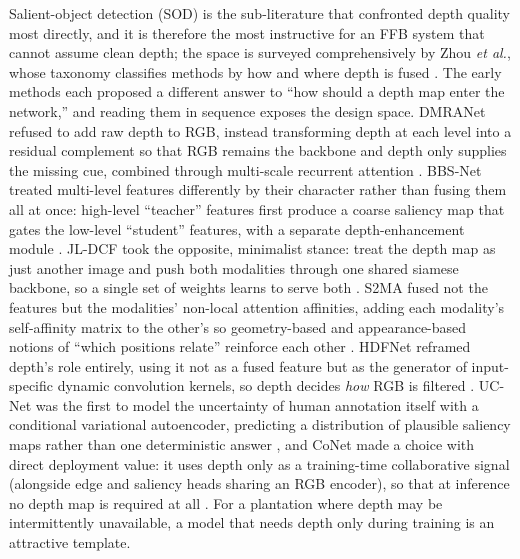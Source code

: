Salient-object detection (SOD) is the sub-literature that confronted depth quality most directly, and it is therefore the most instructive for an FFB system that cannot assume clean depth; the space is surveyed comprehensively by Zhou \textit{et al.}, whose taxonomy classifies methods by how and where depth is fused \cite{zhou2021rgbdsurvey}. The early methods each proposed a different answer to ``how should a depth map enter the network,'' and reading them in sequence exposes the design space. DMRANet refused to add raw depth to RGB, instead transforming depth at each level into a residual complement so that RGB remains the backbone and depth only supplies the missing cue, combined through multi-scale recurrent attention \cite{piao2019dmra}. BBS-Net treated multi-level features differently by their character rather than fusing them all at once: high-level ``teacher'' features first produce a coarse saliency map that gates the low-level ``student'' features, with a separate depth-enhancement module \cite{fan2020bbsnet}. JL-DCF took the opposite, minimalist stance: treat the depth map as just another image and push both modalities through one shared siamese backbone, so a single set of weights learns to serve both \cite{fu2020jldcf}. S2MA fused not the features but the modalities' non-local attention affinities, adding each modality's self-affinity matrix to the other's so geometry-based and appearance-based notions of ``which positions relate'' reinforce each other \cite{liu2020s2ma}. HDFNet reframed depth's role entirely, using it not as a fused feature but as the generator of input-specific dynamic convolution kernels, so depth decides \emph{how} RGB is filtered \cite{pang2020hdfnet}. UC-Net was the first to model the uncertainty of human annotation itself with a conditional variational autoencoder, predicting a distribution of plausible saliency maps rather than one deterministic answer \cite{zhang2020ucnet}, and CoNet made a choice with direct deployment value: it uses depth only as a training-time collaborative signal (alongside edge and saliency heads sharing an RGB encoder), so that at inference no depth map is required at all \cite{ji2020conet}. For a plantation where depth may be intermittently unavailable, a model that needs depth only during training is an attractive template.

